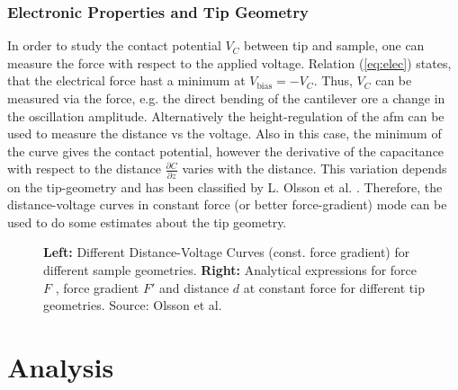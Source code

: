 \documentclass[a4paper]{scrartcl}
\numberwithin{equation}{section}
\numberwithin{figure}{section}
\numberwithin{table}{section}
\newcommand{\Formel}[1]{(\ref{#1})}
\begin{document}
\subsubsection*{Electronic Properties and Tip Geometry}
In order to study the contact potential $V_C$ between tip and sample, one can measure the force with respect to the applied voltage. Relation \Formel{eq:elec} states, that the electrical force hast a minimum at $V_\text{bias} = -V_C$. Thus, $V_C$ can be measured via the force, e.g. the direct bending of the cantilever ore a change in the oscillation amplitude. Alternatively the height-regulation of the afm can be used to measure the distance vs the voltage. Also in this case, the minimum of the curve gives the contact potential, however the derivative of the capacitance with respect to the distance $\frac{\partial C}{\partial z}$ varies with the distance. This variation depends on the tip-geometry and has been classified by L. Olsson et al. \cite{olsson}. Therefore, the distance-voltage curves in constant force (or better force-gradient) mode can be used to do some estimates about the tip geometry.

\begin{figure} 
 \centering
\caption{
\small \textbf{Left:} Different Distance-Voltage Curves (const. force gradient) for different sample geometries. \textbf{Right:} Analytical expressions for force $F$ , force gradient $F'$ and distance $d$ at constant force for different tip geometries. Source: Olsson et al. \cite{olsson} } 
	\label{fig:geometry}
\end{figure}




\section{Analysis}
\end{document}
